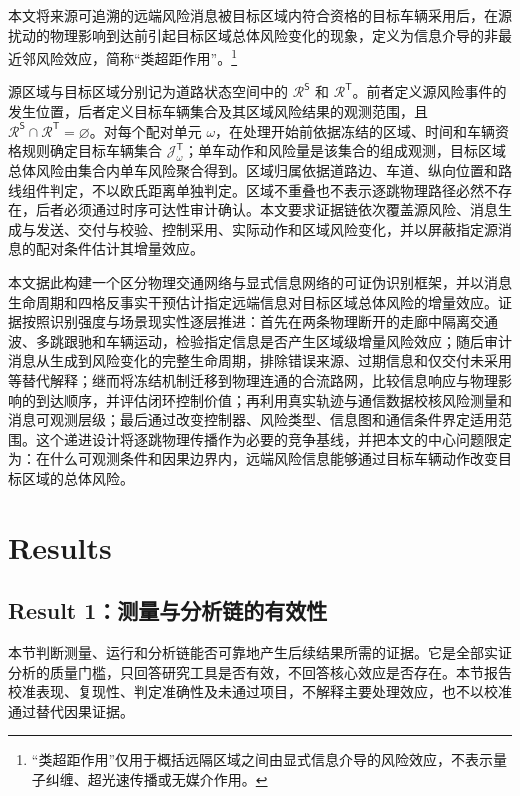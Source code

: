 \documentclass[10pt,a4paper,twocolumn]{article}
\begin{document}
本文将来源可追溯的远端风险消息被目标区域内符合资格的目标车辆采用后，在源扰动的物理影响到达前引起目标区域总体风险变化的现象，定义为信息介导的非最近邻风险效应，简称“类超距作用”。\footnote{“类超距作用”仅用于概括远隔区域之间由显式信息介导的风险效应，不表示量子纠缠、超光速传播或无媒介作用。}

源区域与目标区域分别记为道路状态空间中的 $\mathcal R^{\mathsf S}$ 和 $\mathcal R^{\mathsf T}$。前者定义源风险事件的发生位置，后者定义目标车辆集合及其区域风险结果的观测范围，且 $\mathcal R^{\mathsf S}\cap\mathcal R^{\mathsf T}=\varnothing$。对每个配对单元 $\omega$，在处理开始前依据冻结的区域、时间和车辆资格规则确定目标车辆集合 $\mathcal J^{\mathsf T}_{\omega}$；单车动作和风险量是该集合的组成观测，目标区域总体风险由集合内单车风险聚合得到。区域归属依据道路边、车道、纵向位置和路线组件判定，不以欧氏距离单独判定。区域不重叠也不表示逐跳物理路径必然不存在，后者必须通过时序可达性审计确认。本文要求证据链依次覆盖源风险、消息生成与发送、交付与校验、控制采用、实际动作和区域风险变化，并以屏蔽指定源消息的配对条件估计其增量效应。

本文据此构建一个区分物理交通网络与显式信息网络的可证伪识别框架，并以消息生命周期和四格反事实干预估计指定远端信息对目标区域总体风险的增量效应。证据按照识别强度与场景现实性逐层推进：首先在两条物理断开的走廊中隔离交通波、多跳跟驰和车辆运动，检验指定信息是否产生区域级增量风险效应；随后审计消息从生成到风险变化的完整生命周期，排除错误来源、过期信息和仅交付未采用等替代解释；继而将冻结机制迁移到物理连通的合流路网，比较信息响应与物理影响的到达顺序，并评估闭环控制价值；再利用真实轨迹与通信数据校核风险测量和消息可观测层级；最后通过改变控制器、风险类型、信息图和通信条件界定适用范围。这个递进设计将逐跳物理传播作为必要的竞争基线，并把本文的中心问题限定为：在什么可观测条件和因果边界内，远端风险信息能够通过目标车辆动作改变目标区域的总体风险。


\section*{Results}

\subsection*{Result 1：测量与分析链的有效性}

本节判断测量、运行和分析链能否可靠地产生后续结果所需的证据。它是全部实证分析的质量门槛，只回答研究工具是否有效，不回答核心效应是否存在。本节报告校准表现、复现性、判定准确性及未通过项目，不解释主要处理效应，也不以校准通过替代因果证据。
\end{document}
